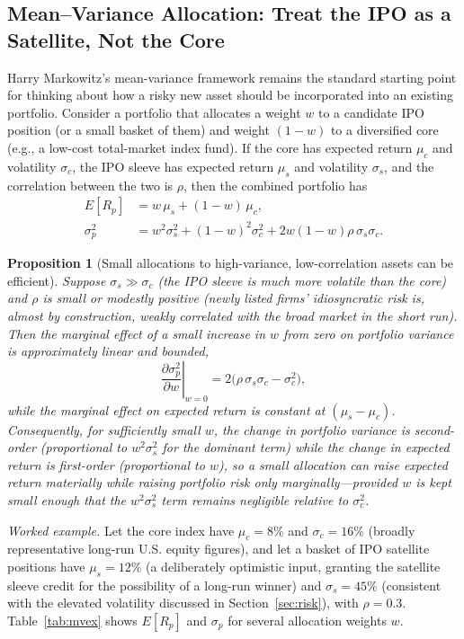 \documentclass[conference]{IEEEtran}
\newtheorem{proposition}{Proposition}
\begin{document}
\subsection{Mean--Variance Allocation: Treat the IPO as a Satellite, Not the Core}
\label{sec:mpt}

Harry Markowitz's mean-variance framework \cite{markowitz1952} remains the standard starting point for thinking about how a risky new asset should be incorporated into an existing portfolio. Consider a portfolio that allocates a weight $w$ to a candidate IPO position (or a small basket of them) and weight $(1-w)$ to a diversified core (e.g., a low-cost total-market index fund). If the core has expected return $\mu_c$ and volatility $\sigma_c$, the IPO sleeve has expected return $\mu_s$ and volatility $\sigma_s$, and the correlation between the two is $\rho$, then the combined portfolio has
\begin{align}
E[R_p] &= w\,\mu_s + (1-w)\,\mu_c, \label{eq:mvret}\\
\sigma_p^2 &= w^2 \sigma_s^2 + (1-w)^2 \sigma_c^2 + 2 w (1-w) \rho\, \sigma_s \sigma_c. \label{eq:mvvar}
\end{align}

\begin{proposition}[Small allocations to high-variance, low-correlation assets can be efficient]
\label{prop:satellite}
Suppose $\sigma_s \gg \sigma_c$ (the IPO sleeve is much more volatile than the core) and $\rho$ is small or modestly positive (newly listed firms' idiosyncratic risk is, almost by construction, weakly correlated with the broad market in the short run). Then the marginal effect of a small increase in $w$ from zero on portfolio variance is approximately linear and bounded,
\[
\left.\frac{\partial \sigma_p^2}{\partial w}\right|_{w=0} = 2\big(\rho\,\sigma_s\sigma_c - \sigma_c^2\big),
\]
while the marginal effect on expected return is constant at $(\mu_s - \mu_c)$. Consequently, for sufficiently small $w$, the change in portfolio variance is second-order (proportional to $w^2 \sigma_s^2$ for the dominant term) while the change in expected return is first-order (proportional to $w$), so a small allocation can raise expected return materially while raising portfolio risk only marginally---\emph{provided} $w$ is kept small enough that the $w^2 \sigma_s^2$ term remains negligible relative to $\sigma_c^2$.
\end{proposition}

\noindent\textit{Worked example.} Let the core index have $\mu_c = 8\%$ and $\sigma_c = 16\%$ (broadly representative long-run U.S. equity figures), and let a basket of IPO satellite positions have $\mu_s = 12\%$ (a deliberately optimistic input, granting the satellite sleeve credit for the possibility of a long-run winner) and $\sigma_s = 45\%$ (consistent with the elevated volatility discussed in Section~\ref{sec:risk}), with $\rho = 0.3$. Table~\ref{tab:mvex} shows $E[R_p]$ and $\sigma_p$ for several allocation weights $w$.
\end{document}
